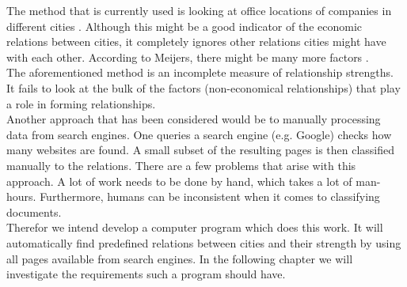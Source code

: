 The method that is currently used is looking at office locations of companies in different cities \cite{derudder2010intercity}. Although this might be a good indicator of the economic relations between cities, it completely ignores other relations cities might have with each other. According to Meijers, there might be many more factors \cite{meijers2007synergy}.\\

The aforementioned method is an incomplete measure of relationship strengths. It fails to look at the bulk of the factors (non-economical relationships) that play a role in forming relationships. \\

Another approach that has been considered would be to manually processing data from search engines. One queries a search engine (e.g. Google) checks how many websites are found. A small subset of the resulting pages is then classified manually to the relations. There are a few problems that arise with this approach. A lot of work needs to be done by hand, which takes a lot of man-hours. Furthermore, humans can be inconsistent when it comes to classifying documents. \\

Therefor we intend develop a computer program which does this work. It will automatically find predefined relations between cities and their strength by using all pages available from search engines. In the following chapter we will investigate the requirements such a program should have.